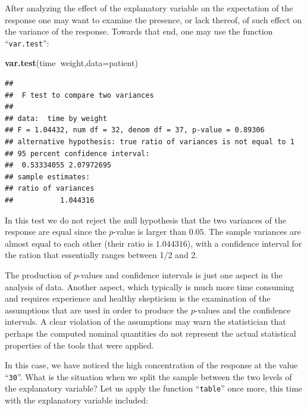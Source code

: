 \documentclass[]{krantz}
\makeatletter
\newenvironment{Shaded}{\begin{snugshade}}{\end{snugshade}}
\newcommand{\KeywordTok}[1]{\textcolor[rgb]{0.13,0.29,0.53}{\textbf{#1}}}
\newcommand{\DataTypeTok}[1]{\textcolor[rgb]{0.13,0.29,0.53}{#1}}
\newcommand{\OperatorTok}[1]{\textcolor[rgb]{0.81,0.36,0.00}{\textbf{#1}}}
\newcommand{\NormalTok}[1]{#1}
\newenvironment{kframe}{%
\medskip{}
\setlength{\fboxsep}{.8em}
 \def\at@end@of@kframe{}%
 \ifinner\ifhmode%
  \def\at@end@of@kframe{\end{minipage}}%
  \begin{minipage}{\columnwidth}%
 \fi\fi%
 \def\FrameCommand##1{\hskip\@totalleftmargin \hskip-\fboxsep
 \colorbox{shadecolor}{##1}\hskip-\fboxsep
     \hskip-\linewidth \hskip-\@totalleftmargin \hskip\columnwidth}%
 \MakeFramed {\advance\hsize-\width
   \@totalleftmargin\z@ \linewidth\hsize
   \@setminipage}}%
 {\par\unskip\endMakeFramed%
 \at@end@of@kframe}
\renewenvironment{Shaded}{\begin{kframe}}{\end{kframe}}
\theoremstyle{definition}
\theoremstyle{definition}
\theoremstyle{definition}
\theoremstyle{remark}
\makeatother
\begin{document}
After analyzing the effect of the explanatory variable on the
expectation of the response one may want to examine the presence, or
lack thereof, of such effect on the variance of the response. Towards
that end, one may use the function ``\texttt{var.test}'':

\begin{Shaded}
\begin{Highlighting}[]
\KeywordTok{var.test}\NormalTok{(time}\OperatorTok{~}\NormalTok{weight,}\DataTypeTok{data=}\NormalTok{patient)}
\end{Highlighting}
\end{Shaded}

\begin{verbatim}
## 
##  F test to compare two variances
## 
## data:  time by weight
## F = 1.04432, num df = 32, denom df = 37, p-value = 0.89306
## alternative hypothesis: true ratio of variances is not equal to 1
## 95 percent confidence interval:
##  0.53334055 2.07972695
## sample estimates:
## ratio of variances 
##           1.044316
\end{verbatim}

In this test we do not reject the null hypothesis that the two variances
of the response are equal since the \(p\)-value is larger than \(0.05\).
The sample variances are almost equal to each other (their ratio is
\(1.044316\)), with a confidence interval for the ration that
essentially ranges between 1/2 and 2.

The production of \(p\)-values and confidence intervals is just one
aspect in the analysis of data. Another aspect, which typically is much
more time consuming and requires experience and healthy skepticism is
the examination of the assumptions that are used in order to produce the
\(p\)-values and the confidence intervals. A clear violation of the
assumptions may warn the statistician that perhaps the computed nominal
quantities do not represent the actual statistical properties of the
tools that were applied.

In this case, we have noticed the high concentration of the response at
the value ``\texttt{30}''. What is the situation when we split the
sample between the two levels of the explanatory variable? Let us apply
the function ``\texttt{table}'' once more, this time with the
explanatory variable included:

\begin{Shaded}
\end{Shaded}
\end{document}
